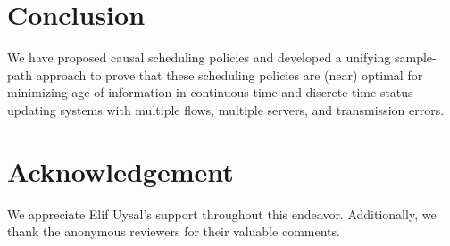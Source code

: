 \section{Conclusion}\label{sec_conclusion}
We have proposed causal scheduling policies and developed a unifying sample-path approach to prove that these scheduling policies are (near) optimal for minimizing age of information in continuous-time and discrete-time status updating systems with multiple flows, multiple servers, and transmission errors. 

\section*{Acknowledgement}

We appreciate Elif Uysal's support throughout this endeavor. Additionally, we thank the anonymous reviewers for their valuable comments.


